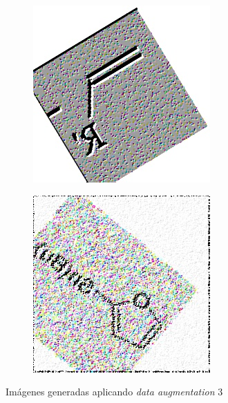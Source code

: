 \begin{figure}[H]
    \begin{subfigure}{.28\textwidth}
        \centering
        \includegraphics[width=1\linewidth]{imagenes/aug3/225.jpg}
    \end{subfigure}%
    \begin{subfigure}{.28\textwidth}
        \centering
        \includegraphics[width=1\linewidth]{imagenes/aug3/271.jpg}
    \end{subfigure}

    \caption{Imágenes generadas aplicando \textit{data augmentation} 3}
\end{figure}

